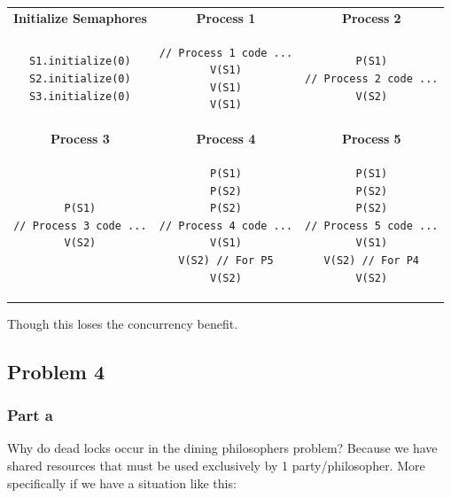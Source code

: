 \documentclass[english]{article}
\begin{document}
\begin{table}[H]
\begin{tabular}{|c|c|c|}
\hline
\textbf{Initialize Semaphores} & \textbf{Process 1} & \textbf{Process 2}  \\

\begin{lstlisting}
S1.initialize(0)
S2.initialize(0)
S3.initialize(0)
\end{lstlisting}
 & 
 \begin{lstlisting}
// Process 1 code ...
V(S1)
V(S1)
V(S1)
\end{lstlisting}
& 
\begin{lstlisting}
P(S1)
// Process 2 code ...
V(S2)
\end{lstlisting} \\ \hline \hline
\textbf{Process 3} & \textbf{Process 4} & \textbf{Process 5} \\

\begin{lstlisting}
P(S1)
// Process 3 code ...
V(S2)
\end{lstlisting}
& 
\begin{lstlisting}
P(S1)
P(S2)
P(S2)
// Process 4 code ...
V(S1)
V(S2) // For P5
V(S2)
\end{lstlisting}
&
\begin{lstlisting}
P(S1)
P(S2)
P(S2)
// Process 5 code ...
V(S1)
V(S2) // For P4
V(S2)
\end{lstlisting} \\\hline

\end{tabular}
\end{table}

Though this loses the concurrency benefit.


\subsection*{Problem 4}
\subsubsection*{Part a}
Why do dead locks occur in the dining philosophers problem? Because we have shared resources that must be used exclusively by 1 party/philosopher.
More specifically if we have a situation like this:
\end{document}

